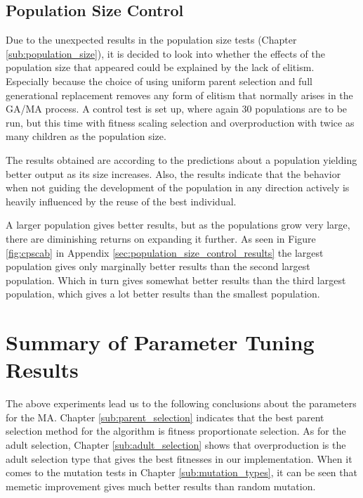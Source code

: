 \subsection{Population Size Control} %
\label{sub:population_size_control}

Due to the unexpected results in the population size tests (Chapter \ref{sub:population_size}), it is decided to look into whether the effects of the population size that appeared could be explained by the lack of elitism. Especially because the choice of using uniform parent selection and full generational replacement removes any form of elitism that normally arises in the GA/MA process. A control test is set up, where again 30 populations are to be run, but this time with fitness scaling selection and overproduction with twice as many children as the population size.

The results obtained are according to the predictions about a population yielding better output as its size increases. Also, the results indicate that the behavior when not guiding the development of the population in any direction actively is heavily influenced by the reuse of the best individual. 

A larger population gives better results, but as the populations grow very large, there are diminishing returns on expanding it further. As seen in Figure \ref{fig:cpscab} in Appendix \ref{sec:population_size_control_results} the largest population gives only marginally better results than the second largest population. Which in turn gives somewhat better results than the third largest population, which gives a lot better results than the smallest population.

\section{Summary of Parameter Tuning Results} %
\label{sec:evaluation_and_conclusion}

The above experiments lead us to the following conclusions about the parameters for the MA. Chapter \ref{sub:parent_selection} indicates that the best parent selection method for the algorithm is fitness proportionate selection. As for the adult selection, Chapter \ref{sub:adult_selection} shows that overproduction is the adult selection type that gives the best fitnesses in our implementation. When it comes to the mutation tests in Chapter \ref{sub:mutation_types}, it can be seen that memetic improvement gives much better results than random mutation.

